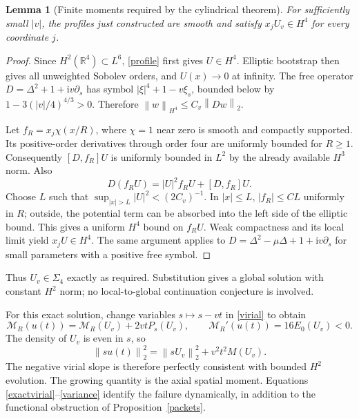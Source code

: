 \documentclass[11pt,a4paper]{article}
\newtheorem{lemma}{Lemma}
\newcommand{\R}{\mathbb R}
\newcommand{\ii}{\mathrm i}
\newcommand{\norm}[1]{\left\|#1\right\|}
\begin{document}
\begin{lemma}[Finite moments required by the cylindrical theorem]
For sufficiently small $|v|$, the profiles just constructed are smooth and satisfy $x_jU_v\in H^4$ for every coordinate $j$.
\end{lemma}
\begin{proof}
Since $H^2(\R^4)\subset L^6$, \eqref{profile} first gives $U\in H^4$. Elliptic bootstrap then gives all unweighted Sobolev orders, and $U(x)\to0$ at infinity. The free operator $D=\Delta^2+1+\ii v\partial_s$ has symbol $|\xi|^4+1-v\xi_s$, bounded below by $1-3(|v|/4)^{4/3}>0$. Therefore $\norm w_{H^4}\le C_v\norm{Dw}_2$.

Let $f_R=x_j\chi(x/R)$, where $\chi=1$ near zero is smooth and compactly supported. Its positive-order derivatives through order four are uniformly bounded for $R\ge1$. Consequently $[D,f_R]U$ is uniformly bounded in $L^2$ by the already available $H^3$ norm. Also
\[
 D(f_RU)=|U|^2f_RU+[D,f_R]U.
\]
Choose $L$ such that $\sup_{|x|>L}|U|^2<(2C_v)^{-1}$. In $|x|\le L$, $|f_R|\le C L$ uniformly in $R$; outside, the potential term can be absorbed into the left side of the elliptic bound. This gives a uniform $H^4$ bound on $f_RU$. Weak compactness and its local limit yield $x_jU\in H^4$. The same argument applies to $D=\Delta^2-\mu\Delta+1+\ii v\partial_s$ for small parameters with a positive free symbol.
\end{proof}

Thus $U_v\in\Sigma_4$ exactly as required. Substitution gives a global solution with constant $H^2$ norm; no local-to-global continuation conjecture is involved.

For this exact solution, change variables $s\mapsto s-vt$ in \eqref{virial} to obtain
\begin{equation}\label{exactvirial}
 \mathcal M_R(u(t))=\mathcal M_R(U_v)+2vtP_s(U_v),
 \qquad\mathcal M_R'(u(t))=16E_0(U_v)<0.
\end{equation}
The density of $U_v$ is even in $s$, so
\begin{equation}\label{variance}
 \norm{su(t)}_2^2=\norm{sU_v}_2^2+v^2t^2M(U_v).
\end{equation}
The negative virial slope is therefore perfectly consistent with bounded $H^2$ evolution. The growing quantity is the axial spatial moment. Equations \eqref{exactvirial}--\eqref{variance} identify the failure dynamically, in addition to the functional obstruction of Proposition~\ref{packets}.
\end{document}

